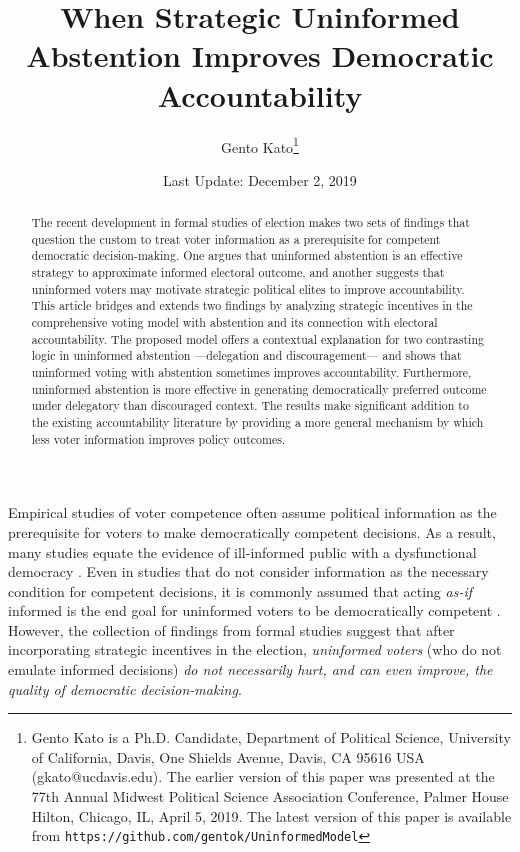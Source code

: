 \documentclass[letterpaper, 12pt]{article}
\title{When Strategic Uninformed Abstention Improves Democratic Accountability}
\author{Gento Kato\thanks{Gento Kato is a Ph.D. Candidate, Department of Political Science, University of California, Davis, One Shields Avenue, Davis, CA 95616 USA (gkato@ucdavis.edu). The earlier version of this paper was presented at the 77th Annual Midwest Political Science Association Conference, Palmer House Hilton, Chicago, IL, April 5, 2019. The latest version of this paper is available from \texttt{https://github.com/gentok/UninformedModel}}}
\affil{University of California, Davis}
\date{Last Update: December 2, 2019}
\begin{document}
    
    \begin{titlepage}
    
    
    \maketitle
    \thispagestyle{empty}
    
    \clearpage
    \thispagestyle{empty}
    
    \begin{abstract}
        The recent development in formal studies of election makes two sets of findings that question the custom to treat voter information as a prerequisite for competent democratic decision-making. One argues that uninformed abstention is an effective strategy to approximate informed electoral outcome, and another suggests that uninformed voters may motivate strategic political elites to improve accountability. This article bridges and extends two findings by analyzing strategic incentives in the comprehensive voting model with abstention and its connection with electoral accountability. The proposed model offers a contextual explanation for two contrasting logic in uninformed abstention ---delegation and discouragement--- and shows that uninformed voting with abstention sometimes improves accountability. Furthermore, uninformed abstention is more effective in generating democratically preferred outcome under delegatory than discouraged context. The results make significant addition to the existing accountability literature by providing a more general mechanism by which less voter information improves policy outcomes.
    \end{abstract}
    \end{titlepage}
    
    \clearpage
    
    \par Empirical studies of voter competence often assume political information as the prerequisite for voters to make democratically competent decisions. As a result, many studies equate the evidence of ill-informed public with a dysfunctional democracy \citep{Converse1964thna, Dellicarpini1996wham, Bartels1996unvo, Somin1998voig, Achen2016defo}. Even in studies that do not consider information as the necessary condition for competent decisions, it is commonly assumed that acting \textit{as-if} informed is the end goal for uninformed voters to be democratically competent \citep{Lupia1994shve, Lupia2016unwh, Popkin1994thre, Boudreau2009clth}. However, the collection of findings from formal studies suggest that after incorporating strategic incentives in the election, \textit{uninformed voters} (who do not emulate informed decisions) \textit{do not necessarily hurt, and can even improve, the quality of democratic decision-making}. 
\end{document}

